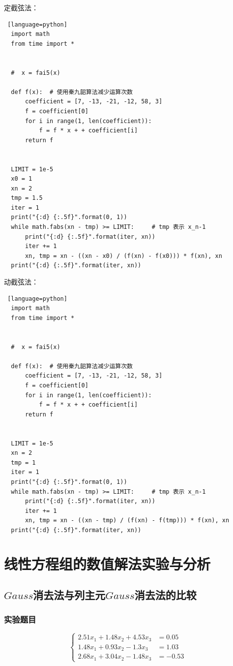 \documentclass[UTF8]{ctexart}
\begin{document}
\quad

定截弦法：
\begin{lstlisting} [language=python]
  import math
  from time import *
  
  
  #  x = fai5(x)
  
  def f(x):  # 使用秦九韶算法减少运算次数
      coefficient = [7, -13, -21, -12, 58, 3]
      f = coefficient[0]
      for i in range(1, len(coefficient)):
          f = f * x + + coefficient[i]
      return f
  
  
  LIMIT = 1e-5
  x0 = 1
  xn = 2
  tmp = 1.5
  iter = 1
  print("{:d} {:.5f}".format(0, 1))
  while math.fabs(xn - tmp) >= LIMIT:     # tmp 表示 x_n-1
      print("{:d} {:.5f}".format(iter, xn))
      iter += 1
      xn, tmp = xn - ((xn - x0) / (f(xn) - f(x0))) * f(xn), xn
  print("{:d} {:.5f}".format(iter, xn))  
\end{lstlisting}

\quad

动截弦法：
\begin{lstlisting} [language=python]
  import math
  from time import *
  
  
  #  x = fai5(x)
  
  def f(x):  # 使用秦九韶算法减少运算次数
      coefficient = [7, -13, -21, -12, 58, 3]
      f = coefficient[0]
      for i in range(1, len(coefficient)):
          f = f * x + + coefficient[i]
      return f
  
  
  LIMIT = 1e-5
  xn = 2
  tmp = 1
  iter = 1
  print("{:d} {:.5f}".format(0, 1))
  while math.fabs(xn - tmp) >= LIMIT:     # tmp 表示 x_n-1
      print("{:d} {:.5f}".format(iter, xn))
      iter += 1
      xn, tmp = xn - ((xn - tmp) / (f(xn) - f(tmp))) * f(xn), xn
  print("{:d} {:.5f}".format(iter, xn))  
\end{lstlisting}

\newpage

\section{线性方程组的数值解法实验与分析}
\subsection{$Gauss$消去法与列主元$Gauss$消去法的比较}
\subsubsection{实验题目}
$$
  \left\{\begin{aligned}
      2.51 x_{1}+1.48 x_{2}+4.53 x_{3} &=0.05 \\
      1.48 x_{1}+0.93 x_{2}-1.3 x_{3} &=1.03 \\
      2.68 x_{1}+3.04 x_{2}-1.48 x_{3} &=-0.53
      \end{aligned}\right.
$$
\end{document}
